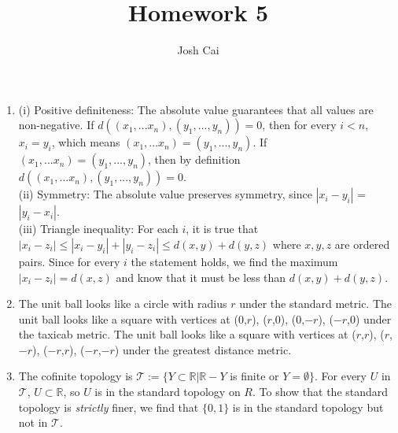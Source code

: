 \documentclass{article}
\begin{document}
\title{Homework 5}
\author{Josh Cai}

\maketitle


\begin{enumerate}
\item
(i) Positive definiteness: The absolute value guarantees that all values are non-negative. If $d((x_1,...x_n),(y_1,...,y_n))=0$, then for every $i<n$, $x_i = y_i$, which means $(x_1,...x_n)=(y_1,...,y_n)$. If $(x_1,...x_n)=(y_1,...,y_n)$, then by definition $d((x_1,...x_n),(y_1,...,y_n))=0$.
\\(ii) Symmetry: The absolute value preserves symmetry, since $|x_i - y_i|$ = $|y_i - x_i|$. 
\\(iii) Triangle inequality: For each $i$, it is true that $|x_i-z_i|\le |x_i-y_i|+|y_i-z_i|\le d(x,y)+d(y,z)$ where $x, y, z$ are ordered pairs. Since for every $i$ the statement holds, we find the maximum $|x_i-z_i| = d(x,z)$ and know that it must be less than $d(x,y)+d(y,z)$.

\item
The unit ball looks like a circle with radius $r$ under the standard metric. The unit ball looks like a square with vertices at (0,$r$), ($r$,0), (0,$-r$), ($-r$,0) under the taxicab metric. The unit ball looks like a square with vertices at ($r$,$r$), ($r$,$-r$), ($-r$,$r$), ($-r$,$-r$) under the greatest distance metric.

\item
The cofinite topology is $\mathcal{T}:=\{Y\subset\mathbb{R}|\mathbb{R}-Y$ is finite or $Y=\emptyset\}$. For every $U$ in $\mathcal{T}$, $U \subset \mathbb{R}$, so $U$ is in the standard topology on $R$. To show that the standard topology is \textit{strictly} finer, we find that $\{0,1\}$ is in the standard topology but not in $\mathcal{T}$. 


\end{enumerate}
\end{document}
